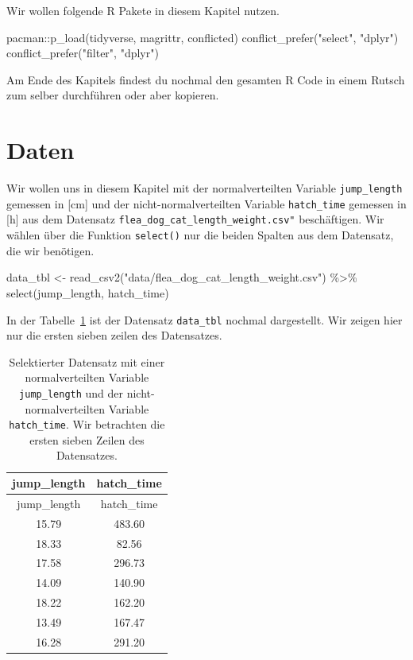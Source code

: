 \documentclass[
  letterpaper,
]{scrbook}
\newenvironment{Shaded}{\begin{snugshade}}{\end{snugshade}}
\newcommand{\FunctionTok}[1]{\textcolor[rgb]{0.28,0.35,0.67}{#1}}
\newcommand{\NormalTok}[1]{\textcolor[rgb]{0.00,0.23,0.31}{#1}}
\newcommand{\OtherTok}[1]{\textcolor[rgb]{0.00,0.23,0.31}{#1}}
\newcommand{\SpecialCharTok}[1]{\textcolor[rgb]{0.37,0.37,0.37}{#1}}
\newcommand{\StringTok}[1]{\textcolor[rgb]{0.13,0.47,0.30}{#1}}
\begin{document}
Wir wollen folgende R Pakete in diesem Kapitel nutzen.

\begin{Shaded}
\begin{Highlighting}[]
\NormalTok{pacman}\SpecialCharTok{::}\FunctionTok{p\_load}\NormalTok{(tidyverse, magrittr, conflicted)}
\FunctionTok{conflict\_prefer}\NormalTok{(}\StringTok{"select"}\NormalTok{, }\StringTok{"dplyr"}\NormalTok{)}
\FunctionTok{conflict\_prefer}\NormalTok{(}\StringTok{"filter"}\NormalTok{, }\StringTok{"dplyr"}\NormalTok{)}
\end{Highlighting}
\end{Shaded}

Am Ende des Kapitels findest du nochmal den gesamten R Code in einem
Rutsch zum selber durchführen oder aber kopieren.

\hypertarget{daten}{%
\section{Daten}\label{daten}}

Wir wollen uns in diesem Kapitel mit der normalverteilten Variable
\texttt{jump\_length} gemessen in {[}cm{]} und der
nicht-normalverteilten Variable \texttt{hatch\_time} gemessen in {[}h{]}
aus dem Datensatz \texttt{flea\_dog\_cat\_length\_weight.csv"}
beschäftigen. Wir wählen über die Funktion \texttt{select()} nur die
beiden Spalten aus dem Datensatz, die wir benötigen.

\begin{Shaded}
\begin{Highlighting}[]
\NormalTok{data\_tbl }\OtherTok{\textless{}{-}} \FunctionTok{read\_csv2}\NormalTok{(}\StringTok{"data/flea\_dog\_cat\_length\_weight.csv"}\NormalTok{) }\SpecialCharTok{\%\textgreater{}\%}
  \FunctionTok{select}\NormalTok{(jump\_length, hatch\_time)}
\end{Highlighting}
\end{Shaded}

In der Tabelle~\ref{tbl-trans-1} ist der Datensatz \texttt{data\_tbl}
nochmal dargestellt. Wir zeigen hier nur die ersten sieben zeilen des
Datensatzes.

\hypertarget{tbl-trans-1}{}
\begin{longtable}[]{@{}cc@{}}
\caption{\label{tbl-trans-1}Selektierter Datensatz mit einer
normalverteilten Variable \texttt{jump\_length} und der
nicht-normalverteilten Variable \texttt{hatch\_time}. Wir betrachten die
ersten sieben Zeilen des Datensatzes.}\tabularnewline
\toprule()
jump\_length & hatch\_time \\
\midrule()
\endfirsthead
\toprule()
jump\_length & hatch\_time \\
\midrule()
\endhead
15.79 & 483.60 \\
18.33 & 82.56 \\
17.58 & 296.73 \\
14.09 & 140.90 \\
18.22 & 162.20 \\
13.49 & 167.47 \\
16.28 & 291.20 \\
\bottomrule()
\end{longtable}
\end{document}
